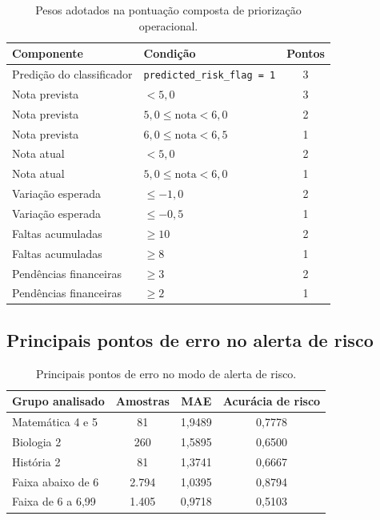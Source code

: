 \begin{table}[ht]
\caption{Pesos adotados na pontua\c{c}\~ao composta de prioriza\c{c}\~ao operacional.}
\label{tab:pesos-priorizacao}
\centering
\footnotesize
\begin{tabular}{l l c}
\hline
\textbf{Componente} & \textbf{Condi\c{c}\~ao} & \textbf{Pontos} \\
\hline
Predi\c{c}\~ao do classificador & \texttt{predicted\_risk\_flag = 1} & 3 \\
Nota prevista & $< 5{,}0$ & 3 \\
Nota prevista & $5{,}0 \leq \text{nota} < 6{,}0$ & 2 \\
Nota prevista & $6{,}0 \leq \text{nota} < 6{,}5$ & 1 \\
Nota atual & $< 5{,}0$ & 2 \\
Nota atual & $5{,}0 \leq \text{nota} < 6{,}0$ & 1 \\
Varia\c{c}\~ao esperada & $\leq -1{,}0$ & 2 \\
Varia\c{c}\~ao esperada & $\leq -0{,}5$ & 1 \\
Faltas acumuladas & $\geq 10$ & 2 \\
Faltas acumuladas & $\geq 8$ & 1 \\
Pend\^encias financeiras & $\geq 3$ & 2 \\
Pend\^encias financeiras & $\geq 2$ & 1 \\
\hline
\end{tabular}
\par\smallskip{}\par
\end{table}

\subsection{Principais pontos de erro no alerta de risco}
\label{subsec:pontos-erro-alerta}

\begin{table}[ht]
\caption{Principais pontos de erro no modo de alerta de risco.}
\label{tab:erro-alerta}
\centering
\footnotesize
\begin{tabular}{l c c c}
\hline
\textbf{Grupo analisado} & \textbf{Amostras} & \textbf{MAE} & \textbf{Acur\'acia de risco} \\
\hline
Matem\'atica 4 e 5 & 81 & 1,9489 & 0,7778 \\
Biologia 2 & 260 & 1,5895 & 0,6500 \\
Hist\'oria 2 & 81 & 1,3741 & 0,6667 \\
Faixa abaixo de 6 & 2.794 & 1,0395 & 0,8794 \\
Faixa de 6 a 6,99 & 1.405 & 0,9718 & 0,5103 \\
\hline
\end{tabular}
\par\smallskip{}\par
\end{table}

